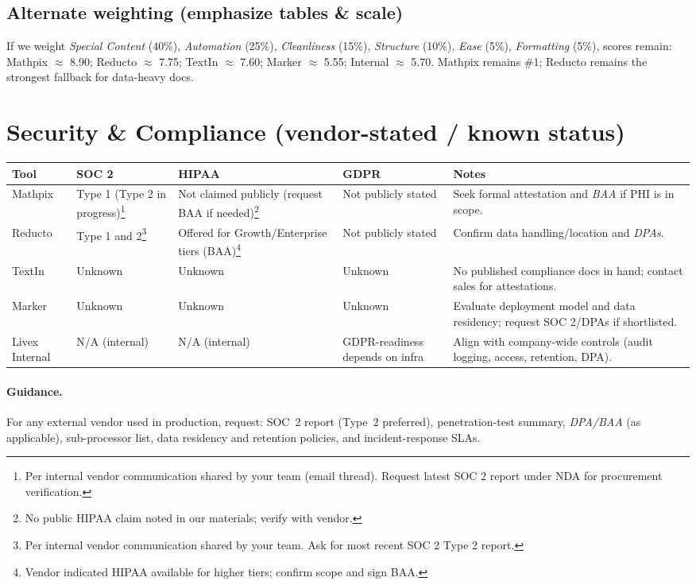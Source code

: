 \documentclass[11pt,a4paper]{article}
\begin{document}
\subsection*{Alternate weighting (emphasize tables \& scale)}
If we weight \emph{Special Content} (40\%), \emph{Automation} (25\%), \emph{Cleanliness} (15\%), \emph{Structure} (10\%), \emph{Ease} (5\%), \emph{Formatting} (5\%), scores remain: Mathpix $\approx$ 8.90; Reducto $\approx$ 7.75; TextIn $\approx$ 7.60; Marker $\approx$ 5.55; Internal $\approx$ 5.70. Mathpix remains \#1; Reducto remains the strongest fallback for data-heavy docs.

\section*{Security \& Compliance (vendor-stated / known status)}
\small
\begin{tabularx}{\textwidth}{@{}l P{1.7cm} P{2.0cm} P{1.5cm} Y@{}}
\toprule
\textbf{Tool} & \textbf{SOC 2} & \textbf{HIPAA} & \textbf{GDPR} & \textbf{Notes} \\
\midrule
Mathpix & Type 1 (Type 2 in progress)\footnote{Per internal vendor communication shared by your team (email thread). Request latest SOC 2 report under NDA for procurement verification.} & Not claimed publicly (request BAA if needed)\footnote{No public HIPAA claim noted in our materials; verify with vendor.} & Not publicly stated & Seek formal attestation and \emph{BAA} if PHI is in scope. \\
Reducto & Type 1 and 2\footnote{Per internal vendor communication shared by your team. Ask for most recent SOC 2 Type 2 report.} & Offered for Growth/Enterprise tiers (BAA)\footnote{Vendor indicated HIPAA available for higher tiers; confirm scope and sign BAA.} & Not publicly stated & Confirm data handling/location and \emph{DPAs}. \\
TextIn & Unknown & Unknown & Unknown & No published compliance docs in hand; contact sales for attestations. \\
Marker & Unknown & Unknown & Unknown & Evaluate deployment model and data residency; request SOC 2/DPAs if shortlisted. \\
Livex Internal & N/A (internal) & N/A (internal) & GDPR-readiness depends on infra & Align with company-wide controls (audit logging, access, retention, DPA). \\
\bottomrule
\end{tabularx}
\normalsize

\paragraph{Guidance.} For any external vendor used in production, request: SOC~2 report (Type~2 preferred), penetration-test summary, \emph{DPA/BAA} (as applicable), sub-processor list, data residency and retention policies, and incident-response SLAs.
\end{document}
